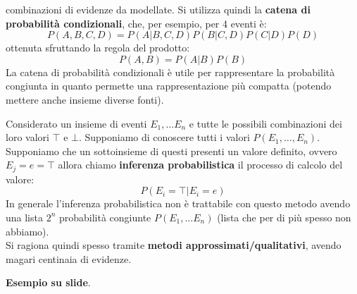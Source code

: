 \documentclass[a4paper,12pt, oneside]{book}
\begin{document}
combinazioni di evidenze da modellate. Si utilizza quindi la \textbf{catena di
  probabilità condizionali}, che, per esempio, per 4 eventi è:
\[P(A,B,C,D)=P(A|B,C,D)P(B|C,D)P(C|D)P(D)\]
ottenuta sfruttando la regola del prodotto:
\[P(A,B)=P(A|B)P(B)\]
La catena di probabilità condizionali è utile per rappresentare la probabilità
congiunta in quanto permette una rappresentazione più compatta (potendo mettere
anche insieme diverse fonti).\\
\begin{definizione}
  Considerato un insieme di eventi $E_1,\ldots E_n$ e tutte le possibili
  combinazioni dei loro valori $\top$ e $\bot$. Supponiamo di conoscere tutti i
  valori $P(E_1,\ldots,E_n)$.  Supponiamo che un sottoinsieme di questi presenti
  un valore definito, ovvero $E_j=e=\top$ allora chiamo \textbf{inferenza
    probabilistica} il processo di calcolo del valore:\\
  \[P(E_i=\top|E_i=e)\]
  In generale l'inferenza probabilistica non è trattabile con questo metodo
  avendo una lista $2^n$ probabilità congiunte $P(E_1,\ldots E_n)$ (lista che
  per di più spesso non abbiamo).\\
  Si ragiona quindi spesso tramite \textbf{metodi approssimati/qualitativi},
  avendo magari centinaia di evidenze.
\end{definizione}
\textbf{Esempio su slide}.\\
\end{document}
